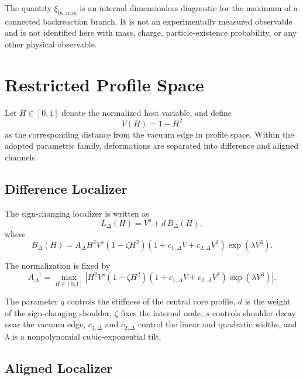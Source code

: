 \documentclass[11pt,a4paper]{article}
\newcommand{\xibr}{\xi_{\mathrm{br,max}}}
\newcommand{\vac}{V}
\newcommand{\host}{H}
\newcommand{\ldiff}{L_{\Delta}}
\begin{document}
The quantity $\xibr$ is an internal dimensionless diagnostic for the maximum of a connected backreaction branch. It is not an experimentally measured observable and is not identified here with mass, charge, particle-existence probability, or any other physical observable.

\section{Restricted Profile Space}

Let $\host\in[0,1]$ denote the normalized host variable, and define
\begin{equation}
\vac(\host)=1-\host^2
\end{equation}
as the corresponding distance from the vacuum edge in profile space. Within the adopted parametric family, deformations are separated into difference and aligned channels.

\subsection{Difference Localizer}

The sign-changing localizer is written as
\begin{equation}
\ldiff(\host)
=\vac^q
+d\,B_{\Delta}(\host),
\label{eq:difference_localizer}
\end{equation}
where
\begin{equation}
B_{\Delta}(\host)
=A_{\Delta}\host^2\vac^s
\left(1-\zeta\host^2\right)
\left(1+c_{1,\Delta}\vac+c_{2,\Delta}\vac^2\right)
\exp\!\left(\lambda\vac^3\right).
\label{eq:difference_basis}
\end{equation}

The normalization is fixed by
\begin{equation}
A_{\Delta}^{-1}
=\max_{\host\in[0,1]}
\left|
\host^2\vac^s
\left(1-\zeta\host^2\right)
\left(1+c_{1,\Delta}\vac+c_{2,\Delta}\vac^2\right)
\exp\!\left(\lambda\vac^3\right)
\right|.
\end{equation}

The parameter $q$ controls the stiffness of the central core profile, $d$ is the weight of the sign-changing shoulder, $\zeta$ fixes the internal node, $s$ controls shoulder decay near the vacuum edge, $c_{1,\Delta}$ and $c_{2,\Delta}$ control the linear and quadratic widths, and $\lambda$ is a nonpolynomial cubic-exponential tilt.

\subsection{Aligned Localizer}
\end{document}
